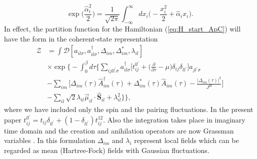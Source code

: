 \documentclass[aps,prb,showpacs,reprint]{revtex4-1}
\begin{document}
\begin{equation}
\exp\bigg(\frac{\hat{\alpha}_i^2}{2}\bigg)=\frac{1}{\sqrt{2\pi}}\int_{-\infty}^{\infty}dx_i\bigg(-\frac{x_i^2}{2}+\hat{\alpha}_ix_i\bigg).
\end{equation}
In effect, the partition function for the Hamiltonian (\ref{eq:H_start_ApC})
will have the form in the coherent-state representation
\begin{equation}
\begin{split}
 \mathcal{Z}&=\int \mathcal{D}[a_{il\sigma},a^{\dagger}_{il\sigma}, \Delta_{im},
\Delta^*_{im}, \lambda_{il}] \\
&\times\exp\bigg\{-\int_0^\beta d\tau
\bigg\{\sum_{ijll^{\prime}\sigma}a^{\dagger}_{il\sigma}\bigg[t_{ij}^{ll^{\prime}}
+\bigg(\frac { \partial}{\partial \tau}-\mu
\bigg)\delta_{ij}\delta_{ll^{\prime}} \bigg]a_{jl^{\prime} \sigma}\\
&-\sum_{im}\bigg[\Delta_{im}(\tau)
\hat{A}^{\dagger}_{im}(\tau)+\Delta^*_{im}(\tau)
\hat{A}_{im}(\tau)-\frac{|\Delta_{im}(\tau)|^2}{J^H}\bigg]\\
&-\sum_{il}\sqrt{2}\lambda_{il} \vec{\mu}_{il} \cdotp \mathbf{\hat{S}}_{il} + \lambda_{il}^2 \bigg\}
\bigg\},
\end{split}
\label{eq:grass}
\end{equation}
where we have included only the spin and the pairing fluctuations. In the
present paper
$t_{ij}^{ll^{\prime}}=t_{ij}\delta_{ll^\prime}+(1-\delta_{ll^{\prime}})t_{ij}^{1
2}$. Also the integration takes place in imaginary time domain and the creation
and anihilation operators are now Grassman variables \cite{Negele}. In this
formulation $\Delta_{im}$ and $\lambda_i$ represent local fields which can be
regarded as mean (Hartree-Fock) fields with Gaussian fluctuations.
\end{document}
